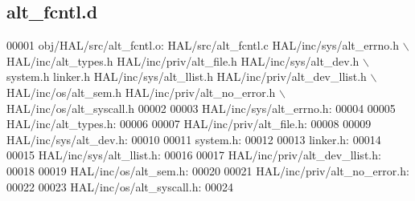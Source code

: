 \subsection{alt\+\_\+fcntl.\+d}
\label{alt__fcntl_8d_source}

\begin{DoxyCode}
00001 obj/HAL/src/alt\_fcntl.o: HAL/src/alt\_fcntl.c HAL/inc/sys/alt_errno.h \(\backslash\)
 HAL/inc/alt\_types.h HAL/inc/priv/alt\_file.h HAL/inc/sys/alt_dev.h \(\backslash\)
 system.h linker.h HAL/inc/sys/alt_llist.h HAL/inc/priv/alt_dev_llist.h \(\backslash\)
 HAL/inc/os/alt\_sem.h HAL/inc/priv/alt_no_error.h \(\backslash\)
 HAL/inc/os/alt\_syscall.h
00002 
00003 HAL/inc/sys/alt_errno.h:
00004 
00005 HAL/inc/alt\_types.h:
00006 
00007 HAL/inc/priv/alt\_file.h:
00008 
00009 HAL/inc/sys/alt_dev.h:
00010 
00011 system.h:
00012 
00013 linker.h:
00014 
00015 HAL/inc/sys/alt_llist.h:
00016 
00017 HAL/inc/priv/alt_dev_llist.h:
00018 
00019 HAL/inc/os/alt\_sem.h:
00020 
00021 HAL/inc/priv/alt_no_error.h:
00022 
00023 HAL/inc/os/alt\_syscall.h:
00024 \end{DoxyCode}
